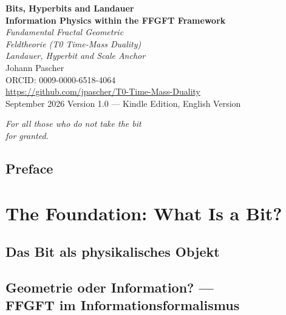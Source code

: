 \documentclass[11pt,oneside]{book}
\theoremstyle{plain}
\begin{document}
\begin{titlepage}
\centering\vspace*{1.5cm}
{\Huge\bfseries\color{blue!70!black} Bits, Hyperbits and Landauer}\\[0.6cm]
{\Large\bfseries\color{blue!40!black} Information Physics within the FFGFT Framework}\\[1cm]
{\LARGE\itshape Fundamental Fractal Geometric\\[0.2cm]
Feldtheorie (T0 Time-Mass Duality)}\\[0.5cm]
{\large\itshape Landauer, Hyperbit and Scale Anchor}\\[2cm]
{\large Johann Pascher}\\[0.3cm]
{\normalsize ORCID: 0009-0000-6518-4064}\\[0.3cm]
{\normalsize\url{https://github.com/jpascher/T0-Time-Mass-Duality}}\\[1.5cm]
{\normalsize September 2026}
\vfill{\small Version 1.0 --- Kindle Edition, English Version}
\end{titlepage}

\thispagestyle{empty}
\vspace*{0.3\textheight}
\begin{center}\itshape\large
For all those who do not take the bit\\for granted.
\end{center}\vfill

\tableofcontents

\chapter*{Preface}


\mainmatter

\part{The Foundation: What Is a Bit?}
\chapter{Das Bit als physikalisches Objekt}

\chapter[Geometrie oder Information?]{Geometrie oder Information? ---\\ FFGFT im Informationsformalismus}

\end{document}
